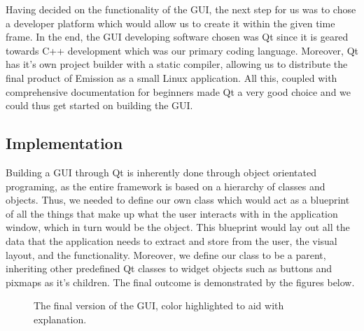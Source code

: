 \documentclass[a4paper]{article}
\begin{document}
Having decided on the functionality of the GUI, the next step for us was to chose a developer platform which would allow us to create it within the given time frame. In the end, the GUI developing software chosen was Qt since it is geared towards C++ development which was our primary coding language. Moreover, Qt has it's own project builder with a static compiler, allowing us to distribute the final product of Emission as a small Linux application. All this, coupled with comprehensive documentation for beginners made Qt a very good choice and we could thus get started on building the GUI.

\subsection*{Implementation}

Building a GUI through Qt is inherently done through object orientated programing, as the entire framework is based on a hierarchy of classes and objects. Thus, we needed to define our own class which would act as a blueprint of all the things that make up what the user interacts with in the application window, which in turn would be the object. This blueprint would lay out all the data that the application needs to extract and store from the user, the visual layout, and the functionality. Moreover, we define our class to be a parent, inheriting other predefined Qt classes to widget objects such as buttons and pixmaps as it's children. The final outcome is demonstrated by the figures below.
\newpage

\begin{figure}[!h]
  \centering
  \hfill
  \caption{The final version of the GUI, color highlighted to aid with explanation.}
\end{figure}
\end{document}
